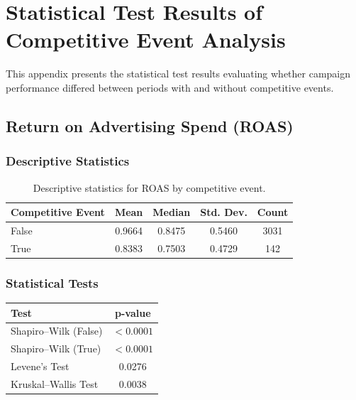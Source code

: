 \section{Statistical Test Results of Competitive Event Analysis}
\label{appendix:competitive_event_performance_analysis}

This appendix presents the statistical test results evaluating whether campaign performance differed between periods with and without competitive events.

\subsection{Return on Advertising Spend (ROAS)} \label{appendix:competitive_event_performance_analysis_ROAS}

\subsubsection{Descriptive Statistics}

\begin{table}[H]
	\centering
	\caption{Descriptive statistics for ROAS by competitive event.}
	\begin{tabular}{lcccc}
		\toprule
		Competitive Event & Mean & Median & Std. Dev. & Count\\
		\midrule
		False & 0.9664 & 0.8475 & 0.5460 & 3031\\
		True  & 0.8383 & 0.7503 & 0.4729 & 142\\
		\bottomrule
	\end{tabular}
\end{table}

\subsubsection{Statistical Tests}

\begin{table}[H]
	\centering
	\begin{tabular}{lc}
		\toprule
		Test & p-value\\
		\midrule
		Shapiro--Wilk (False) & $<0.0001$\\
		Shapiro--Wilk (True) & $<0.0001$\\
		Levene's Test & 0.0276\\
		Kruskal--Wallis Test & 0.0038\\
		\bottomrule
	\end{tabular}
\end{table}

